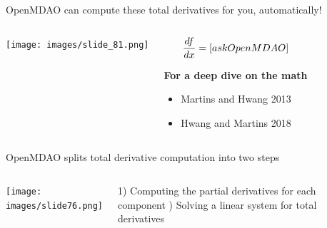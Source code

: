 \documentclass[aspectratio=169, usenames,dvipsnames, 14pt]{beamer}
\begin{document}

\begin{frame}{OpenMDAO can compute these total derivatives for you, automatically!}
\begin{columns}
        \texttt{[image: images/slide\_81.png]}
    
        \begin{center}

        \begin{equation*}
            \LARGE\frac{df}{dx} = [ask OpenMDAO]
        \end{equation*}
       
    \textbf{For a deep dive on the math}
            \begin{itemize}
                \item Martins and Hwang 2013
                \item Hwang and Martins 2018 
            \end{itemize}
        \end{center}
\end{columns}
    
\end{frame}



\begin{frame}{OpenMDAO splits total derivative computation into two steps}
\begin{columns}
        \texttt{[image: images/slide76.png]}
        
         1) Computing the partial derivatives for each component \newline {}) Solving a linear system for total derivatives
\end{columns}
    
\end{frame}

\end{document}
